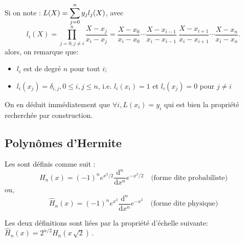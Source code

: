 \medskip
Si on note : $L(X) = \displaystyle\sum_{j=0}^{n} y_j l_j(X)$, avec
\begin{equation}
l_i(X) = \prod_{j=0, j\neq i}^{n} \frac{X-x_j}{x_i-x_j} = \frac{X-x_0}{x_i-x_0} \cdots \frac{X-x_{i-1}}{x_i-x_{i-1}} ~ \frac{X-x_{i+1}}{x_i-x_{i+1}} \cdots \frac{X-x_{n}}{x_i-x_{n}}.
\end{equation}
alors, on remarque que:
\begin{itemize}
   \item $l_i$ est de degré $n$ pour tout $i$;
   \item $l_i(x_j) = \delta_{i,j}, 0 \leq i,j \leq n$, i.e. $l_i(x_i) = 1$ et $l_i(x_j) = 0$ pour $j\ne i$
\end{itemize}

On en déduit immédiatement que $\forall i, L(x_i) = y_i$ qui est bien la propriété
recherchée par construction.




\medskip
\subsection{Polynômes d'Hermite}

Les  
sont définis comme suit :
\begin{equation}
    H_n(x)=(-1)^n e^{x^2/2}\frac{\mathrm{d}^n}{\mathrm{d}x^n}e^{-x^2/2} \quad \text{(forme dite probabiliste)}
\end{equation}
ou,
\begin{equation}
    \widehat{H}_n(x)=(-1)^n e^{x^2}\frac{\mathrm{d}^n}{\mathrm{d}x^n}e^{-x^2} \quad \text{(forme dite physique)}
\end{equation}

Les deux définitions sont liées par la propriété d'échelle suivante: 
$\widehat{H}_n(x) = 2^{n/2}H_n \left(x\,\sqrt{2} \right)\,\!.$

